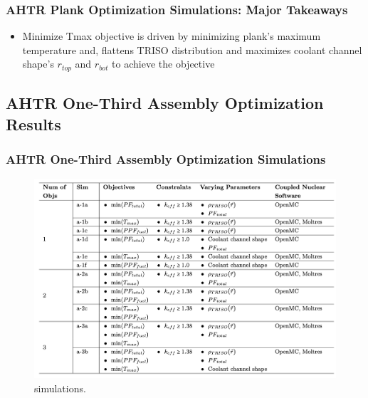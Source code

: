 \begin{frame}
    \frametitle{AHTR Plank Optimization Simulations: Major Takeaways}
    \begin{itemize}
        \item Minimize Tmax objective is driven by minimizing plank's maximum 
        temperature and, flattens TRISO distribution and maximizes coolant channel 
        shape's $r_{top}$ and $r_{bot}$ to achieve the objective
    \end{itemize}
\end{frame}

\subsection{AHTR One-Third Assembly Optimization Results}
\begin{frame}
    \frametitle{AHTR One-Third Assembly Optimization Simulations}
    \begin{figure}
        \includegraphics[width=0.95\linewidth]{figures/ahtr-assem-opt-table.png} 
        \caption{simulations.}
    \end{figure}
\end{frame}